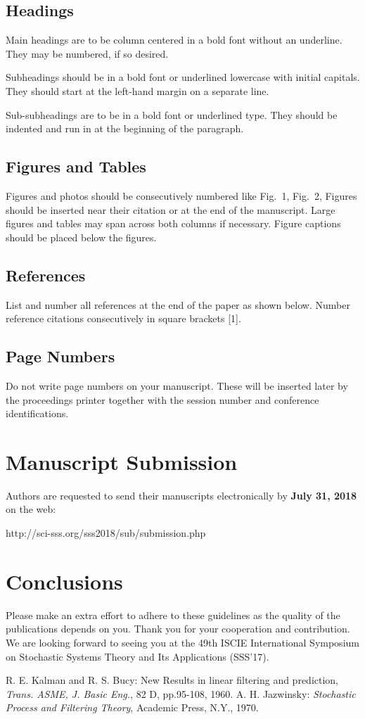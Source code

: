 \documentclass[a4paper]{article}
\begin{document}
\subsection{Headings}
Main headings are to be column centered in a bold font without an underline.
They may be numbered, if so desired. 

Subheadings should be in a bold font or underlined lowercase with initial
capitals.
They should start at the left-hand margin on a separate line.

Sub-subheadings are to be in a bold font or underlined type.
They should be indented and run in at the beginning of the paragraph.

\subsection{Figures and Tables} 
Figures and photos should be consecutively numbered like Fig{.}~1, Fig{.}~2,
Figures should be inserted near their citation or at the end of the manuscript.
Large figures and tables may span across both columns if necessary.
Figure captions should be placed below the figures. 

\subsection{References}
List and number all references at the end of the paper as shown below.
Number reference citations consecutively in square brackets [1].

\subsection{Page Numbers}
Do not write page numbers on your manuscript.
These will be inserted later by the proceedings printer together with
the session number and conference identifications.


\section{Manuscript Submission}
Authors are requested to send their manuscripts electronically by
{\bf July 31, 2018} on the web:
\begin{center}
http://sci-sss.org/sss2018/sub/submission.php
\end{center}


\section{Conclusions}

Please make an extra effort to adhere to these guidelines as the quality
of the publications depends on you.
Thank you for your cooperation and contribution.
We are looking forward to seeing you at the 49th ISCIE International Symposium
on Stochastic Systems Theory and Its Applications (SSS'17).


\begin{thebibliography}{99}
R. E. Kalman and R. S. Bucy: 
New Results in linear filtering and prediction, 
{\it Trans. ASME, J. Basic Eng.}, 82 D, pp.95-108, 1960.
A. H. Jazwinsky: 
{\it Stochastic Process and Filtering Theory}, Academic Press, N.Y., 1970.
\end{thebibliography}
\end{document}
